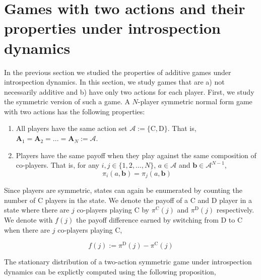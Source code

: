 \documentclass[11pt]{article}
\theoremstyle{plainCl1}
\theoremstyle{plainCl2}
\newcommand{\A}{\mathbf{A}}
\newcommand{\abf}{\mathbf{a}}
\newcommand{\bbf}{\mathbf{b}}
\newcommand{\C}{\mathrm{C}}
\newcommand{\D}{\mathrm{D}}
\begin{document}
\section*{Games with two actions and their properties under introspection dynamics}

In the previous section we studied the properties of additive games under introspection dynamics. In this section, we study games that are a) not necessarily additive and b) have only two actions for each player. First, we study the symmetric version of such a game. A $N$-player symmetric normal form game with two actions has the following properties:

\begin{enumerate}
\item  All players have the same action set $\mathcal{A} := \{\C,\D\}$. That is, $\A_1 = \A_2 = ... = \A_N := \mathcal{A}$. 
\item Players have the same payoff when they play against the same composition of co-players. That is, for any $i,j \in \{1,2,...,N\}$, $a \in \mathcal{A}$ and $\bbf \in \mathcal{A}^{N-1}$,
\begin{equation}
\pi_i(a,\bbf) = \pi_j(a,\bbf)
\end{equation} 
\end{enumerate}

\noindent Since players are symmetric, states can again be enumerated by counting the number of $\C$ players in the state. We denote the payoff of a $\C$ and $\D$ player in a state where there are $j$ co-players playing $\C$ by $\pi^\C(j)$ and $\pi^\D(j)$ respectively. We denote with $f(j)$ the payoff difference earned by switching from $\D$ to $\C$ when there are $j$ co-players playing $\C$, 

\begin{equation}
f(j) := \pi^\D(j) - \pi^\C(j)
\label{Eq:f-switching-CtoD}
\end{equation}

%
\noindent The stationary distribution of a two-action symmetric game under introspection dynamics can be explictly computed using the following proposition, 
\end{document}
